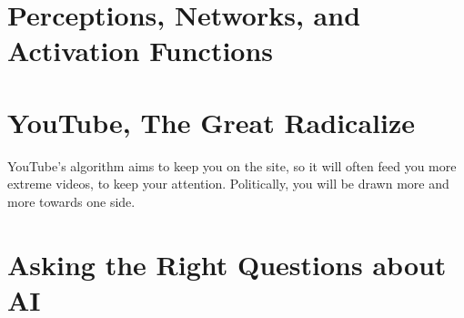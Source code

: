 \documentclass[10pt]{article}
\begin{document}
  \section{Perceptions, Networks, and Activation Functions}%
  \label{sec:perceptrons_networks_and_activation_functions}

  \section{YouTube, The Great Radicalize}%
  \label{sec:youtube_the_great_radicalizer}

  YouTube's algorithm aims to keep you on the site, so it will often feed you
  more extreme videos, to keep your attention. Politically, you will be drawn
  more and more towards one side.

  \section{Asking the Right Questions about AI}%
  \label{sec:asking_the_right_questions_about_ai}



  
\end{document}
